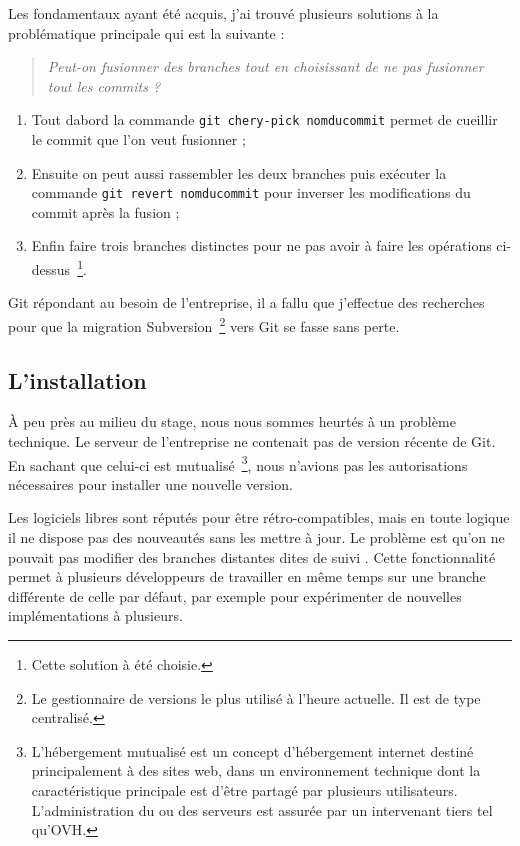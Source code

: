     Les fondamentaux ayant été acquis, j'ai trouvé plusieurs solutions à la
    problématique principale qui est la suivante :

    \begin{quote}
        \emph{Peut-on fusionner des branches tout en choisissant de ne pas
        fusionner tout les commits ?}
    \end{quote}

    \begin{enumerate}
        \item Tout dabord la commande \texttt{git chery-pick nomducommit}
        permet de \og cueillir \fg{} le commit que l'on veut fusionner ; \item
        Ensuite on peut aussi rassembler les deux branches puis exécuter la
        commande \texttt{git revert nomducommit} pour inverser les modifications
        du commit après la fusion ;
        \item Enfin faire trois branches distinctes pour ne pas avoir à
        faire les opérations ci-dessus\, \footnote{Cette solution à été
        choisie.}.
    \end{enumerate}

    Git répondant au besoin de l'entreprise, il a fallu que j'effectue des
    recherches pour que la migration Subversion\, \footnote{Le gestionnaire
    de versions le plus utilisé à l'heure actuelle. Il est de type
    centralisé.} vers Git se fasse sans perte.

    \subsection{L'installation} %
    \label{sub:L'installation}

    À peu près au milieu du stage, nous nous sommes heurtés à un problème
    technique. Le serveur de l'entreprise ne contenait pas de version
    récente de Git. En sachant que celui-ci est mutualisé\,
    \footnote{L'hébergement mutualisé est un concept d'hébergement internet
    destiné principalement à des sites web, dans un environnement technique
    dont la caractéristique principale est d'être partagé par plusieurs
    utilisateurs. L'administration du ou des serveurs est assurée par un
    intervenant tiers tel qu'OVH.}, nous n'avions pas les autorisations
    nécessaires pour installer une nouvelle version.

    Les logiciels libres sont réputés pour être rétro-compatibles, mais en
    toute logique il ne dispose pas des nouveautés sans les mettre à jour.
    Le problème est qu'on ne pouvait pas modifier des branches distantes
    dites \og de suivi \fg{}. Cette fonctionnalité permet à plusieurs
    développeurs de travailler en même temps sur une branche différente de
    celle par défaut, par exemple pour expérimenter de nouvelles
    implémentations à plusieurs.

